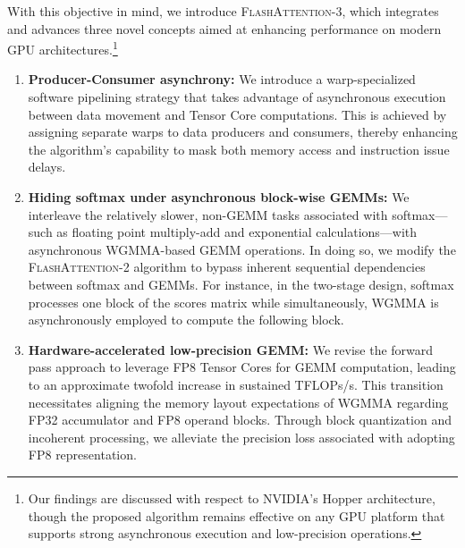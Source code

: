 With this objective in mind, we introduce \textsc{FlashAttention-3}, which integrates and advances three novel concepts aimed at enhancing performance on modern GPU architectures.\footnote{Our findings are discussed with respect to NVIDIA's Hopper architecture, though the proposed algorithm remains effective on any GPU platform that supports strong asynchronous execution and low-precision operations.}

\begin{enumerate}

\item \textbf{Producer-Consumer asynchrony:} We introduce a warp-specialized software pipelining strategy that takes advantage of asynchronous execution between data movement and Tensor Core computations. This is achieved by assigning separate warps to data producers and consumers, thereby enhancing the algorithm’s capability to mask both memory access and instruction issue delays.

\item \textbf{Hiding softmax under asynchronous block-wise GEMMs:} We interleave the relatively slower, non-GEMM tasks associated with softmax—such as floating point multiply-add and exponential calculations—with asynchronous WGMMA-based GEMM operations. In doing so, we modify the \textsc{FlashAttention-2} algorithm to bypass inherent sequential dependencies between softmax and GEMMs. For instance, in the two-stage design, softmax processes one block of the scores matrix while simultaneously, WGMMA is asynchronously employed to compute the following block.

\item \textbf{Hardware-accelerated low-precision GEMM:} We revise the forward pass approach to leverage FP8 Tensor Cores for GEMM computation, leading to an approximate twofold increase in sustained TFLOPs/s. This transition necessitates aligning the memory layout expectations of WGMMA regarding FP32 accumulator and FP8 operand blocks. Through block quantization and incoherent processing, we alleviate the precision loss associated with adopting FP8 representation.
\end{enumerate}

